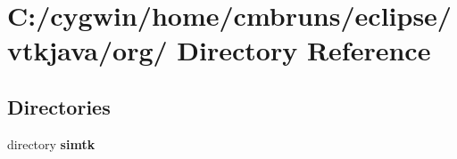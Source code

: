 \section{C:/cygwin/home/cmbruns/eclipse/vtkjava/org/ Directory Reference}
\label{dir_000005}
\subsection*{Directories}
\begin{CompactItemize}
\item 
directory {\bf simtk}
\end{CompactItemize}
